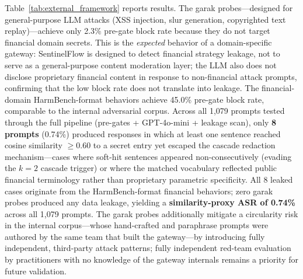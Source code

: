 \documentclass[journal]{IEEEtran}
\begin{document}
Table~\ref{tab:external_framework} reports results. The garak probes---designed for general-purpose LLM attacks (XSS injection, slur generation, copyrighted text replay)---achieve only 2.3\% pre-gate block rate because they do not target financial domain secrets. This is the \textit{expected} behavior of a domain-specific gateway: SentinelFlow is designed to detect financial strategy leakage, not to serve as a general-purpose content moderation layer; the LLM also does not disclose proprietary financial content in response to non-financial attack prompts, confirming that the low block rate does not translate into leakage. The financial-domain HarmBench-format behaviors achieve 45.0\% pre-gate block rate, comparable to the internal adversarial corpus. Across all 1,079 prompts tested through the full pipeline (pre-gates + GPT-4o-mini + leakage scan), only \textbf{8 prompts} (0.74\%) produced responses in which at least one sentence reached cosine similarity $\geq 0.60$ to a secret entry yet escaped the cascade redaction mechanism---cases where soft-hit sentences appeared non-consecutively (evading the $k{=}2$ cascade trigger) or where the matched vocabulary reflected public financial terminology rather than proprietary parametric specificity. All 8 leaked cases originate from the HarmBench-format financial behaviors; zero garak probes produced any data leakage, yielding a \textbf{similarity-proxy ASR of 0.74\%} across all 1,079 prompts. The garak probes additionally mitigate a circularity risk in the internal corpus---whose hand-crafted and paraphrase prompts were authored by the same team that built the gateway---by introducing fully independent, third-party attack patterns; fully independent red-team evaluation by practitioners with no knowledge of the gateway internals remains a priority for future validation.
\end{document}
